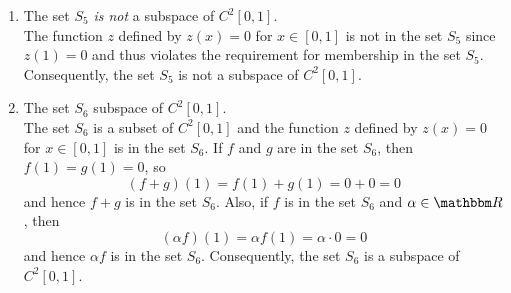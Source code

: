 \begin{solution}
\begin{enumerate}
\item  The set $S_5$ \emph{is not} a subspace of $C^2[0,1]$.\\
The function $z$ defined by $z(x)=0$ for $x\in[0,1]$ is not in the set $S_5$ since $z(1)=0$ and thus violates the requirement for membership in the set $S_5$. Consequently, the set $S_5$ is not a subspace of $C^2[0,1]$.
\\
\item  The set $S_6$ subspace of $C^2[0,1]$.\\
The set $S_6$ is a subset of $C^2[0,1]$ and the function $z$ defined by $z(x)=0$ for $x\in[0,1]$ is in the set $S_6$. If $f$ and $g$ are in the set $S_6$, then $f(1)=g(1)=0$, so
\[
(f+g)(1) = f(1)+g(1) = 0+0 = 0
\]
and hence $f+g$ is in the set $S_6$. Also, if $f$ is in the set $S_6$ and $\alpha\in\R$, then
\[
(\alpha f)(1) = \alpha f(1) = \alpha\cdot 0 = 0
\]
and hence $\alpha f$ is in the set $S_6$. Consequently, the set $S_6$ is a subspace of $C^2[0,1]$.
\end{enumerate}
\end{solution}